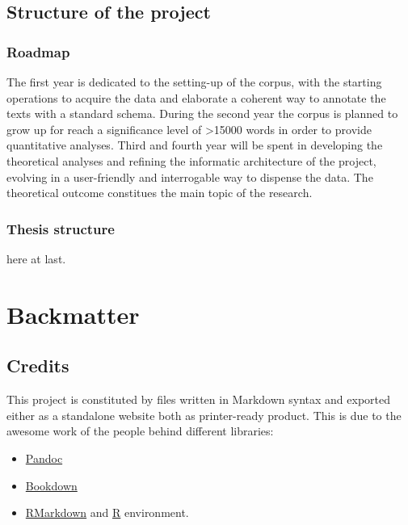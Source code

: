 \documentclass[a4paper,twoside,11pt,chapterprefix=false,bibliography=totocnumbered]{scrbook}
\providecommand{\tightlist}{%
  \setlength{\itemsep}{0pt}\setlength{\parskip}{0pt}}
\theoremstyle{definition}
\theoremstyle{definition}
\theoremstyle{definition}
\theoremstyle{remark}
\begin{document}
\section{Structure of the project}\label{structure-of-the-project}

\subsection{Roadmap}\label{roadmap}

The first year is dedicated to the setting-up of the corpus, with the
starting operations to acquire the data and elaborate a coherent way to
annotate the texts with a standard schema. During the second year the
corpus is planned to grow up for reach a significance level of
\textgreater{}15000 words in order to provide quantitative analyses.
Third and fourth year will be spent in developing the theoretical
analyses and refining the informatic architecture of the project,
evolving in a user-friendly and interrogable way to dispense the data.
The theoretical outcome constitues the main topic of the research.

\subsection{Thesis structure}\label{thesis-structure}

here at last.

\chapter{Backmatter}\label{backmatter}

\section{Credits}\label{credits}

This project is constituted by files written in Markdown syntax and
exported either as a standalone website both as printer-ready product.
This is due to the awesome work of the people behind different
libraries:

\begin{itemize}
\tightlist
\item
  \href{https://bookdown.org}{Pandoc}
\item
  \href{https://bookdown.org}{Bookdown}
\item
  \href{https://bookdown.org}{RMarkdown} and
  \href{https://bookdown.org}{R} environment.
\end{itemize}
\end{document}
